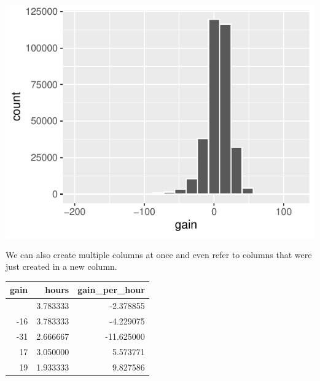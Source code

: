 \documentclass[
  letterpaper,
  DIV=11,
  numbers=noendperiod]{scrartcl}
\begin{document}
\begin{center}
\includegraphics{notes_files/figure-pdf/Histogram of gained time-1.pdf}
\end{center}

We can also create multiple columns at once and even refer to columns
that were just created in a new column.

\begin{longtable}[]{@{}rrr@{}}
\toprule\noalign{}
gain & hours & gain\_per\_hour \\
\midrule\noalign{}
\endhead
\bottomrule\noalign{}
\endlastfoot
-9 & 3.783333 & -2.378855 \\
-16 & 3.783333 & -4.229075 \\
-31 & 2.666667 & -11.625000 \\
17 & 3.050000 & 5.573771 \\
19 & 1.933333 & 9.827586 \\
\end{longtable}
\end{document}
